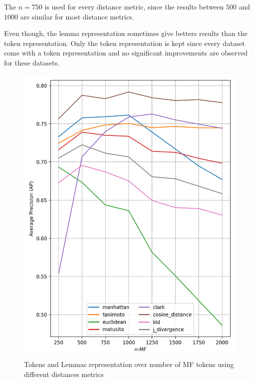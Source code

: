 The $n = 750$ is used for every distance metric, since the results between $500$ and $1000$ are similar for most distance metrics.

Even though, the lemma representation sometimes give betters results than the token representation.
Only the token representation is kept since every dataset come with a token representation and no significant improvements are observed for these datasets.

\begin{figure}
  \centering
  \caption{Tokens and Lemmas representation over number of MF tokens using different distances metrics}
  \label{fig:tokens_lemmas}

  \label{fig:tokens}
  \includegraphics[width=0.9\linewidth]{img/mf_tokens.png}

  \vspace{0.5cm}


\end{figure}
